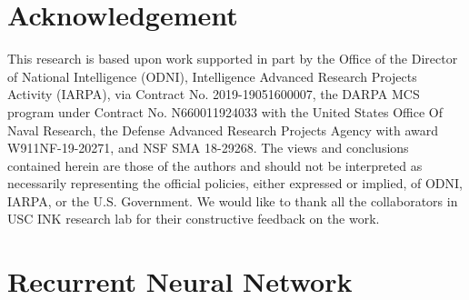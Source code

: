 \documentclass[11pt,a4paper]{article}
\begin{document}
\section*{Acknowledgement}
This research is based upon work supported in part by the Office of the Director of National Intelligence (ODNI), Intelligence Advanced Research Projects Activity (IARPA), via Contract No. 2019-19051600007, the DARPA MCS program under Contract No. N660011924033 with the United States Office Of Naval Research, the Defense Advanced Research Projects Agency with award W911NF-19-20271, and NSF SMA 18-29268. The views and conclusions contained herein are those of the authors and should not be interpreted as necessarily representing the official policies, either expressed or implied, of ODNI, IARPA, or the U.S. Government. We would like to thank all the collaborators in USC INK research lab for their constructive feedback on the work.





\clearpage
\appendix





\section{Recurrent Neural Network}
\end{document}
